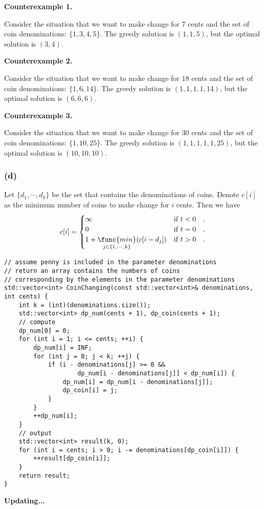\textbf{Counterexample 1.}

Consider the situation that we want to make change for $7$ cents and 
the set of coin denominations: $\{ 1, 3, 4, 5 \}$.
The greedy solution is $(1, 1, 5)$, 
but the optimal solution is $(3, 4)$.

\textbf{Counterexample 2.}

Consider the situation that we want to make change for $18$ cents and 
the set of coin denominations: $\{ 1, 6, 14 \}$.
The greedy solution is $(1, 1, 1, 1, 14)$, 
but the optimal solution is $(6, 6, 6)$.

\textbf{Counterexample 3.}

Consider the situation that we want to make change for $30$ cents and 
the set of coin denominations: $\{ 1, 10, 25 \}$.
The greedy solution is $(1, 1, 1, 1, 1, 25)$, 
but the optimal solution is $(10, 10, 10)$.

\subsubsection*{(d)}

Let $\{ d_1, \cdots, d_k \}$ be the set that contains the denominations of coins.
Denote $c[i]$ as the minimum number of coins to make change for $i$ cents.
Then we have 
\begin{equation*}
    c[i] = 
    \begin{cases}
        \infty & \text{if } t < 0 \quad , \\
        0 & \text{if } t = 0 \quad , \\
        1 + \mathop{\func{min}}\limits_{j \in \{ 1, \cdots, k \}}
            (c[i - d_j]) & \text{if } t > 0 \quad . \\
    \end{cases}
\end{equation*}

\begin{verbatim}
// assume penny is included in the parameter denominations
// return an array contains the numbers of coins 
// corresponding by the elements in the parameter denominations
std::vector<int> CoinChanging(const std::vector<int>& denominations, int cents) {
    int k = (int)(denominations.size());
    std::vector<int> dp_num(cents + 1), dp_coin(cents + 1);
    // compute
    dp_num[0] = 0;
    for (int i = 1; i <= cents; ++i) {
        dp_num[i] = INF;
        for (int j = 0; j < k; ++j) {
            if (i - denominations[j] >= 0 && 
                    dp_num[i - denominations[j]] < dp_num[i]) {
                dp_num[i] = dp_num[i - denominations[j]];
                dp_coin[i] = j;
            }
        }
        ++dp_num[i];
    }
    // output
    std::vector<int> result(k, 0);
    for (int i = cents; i > 0; i -= denominations[dp_coin[i]]) {
        ++result[dp_coin[i]];
    }
    return result;
}
\end{verbatim}
    
\centerline{\textbf{Updating...}}

